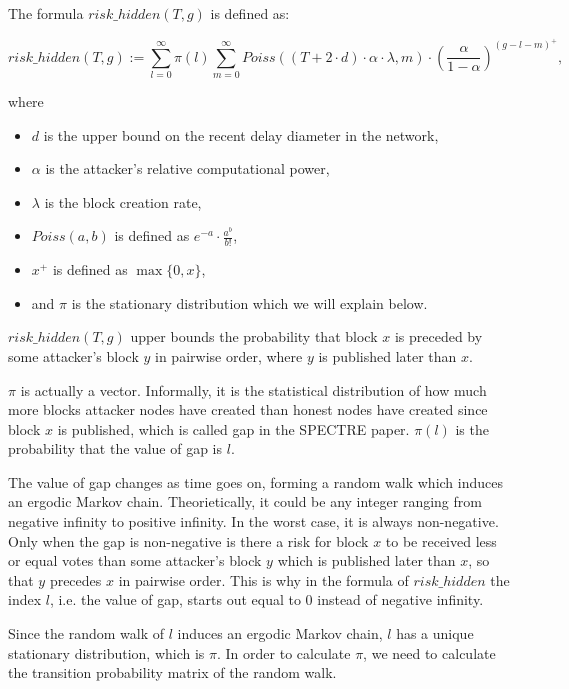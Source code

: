 \documentclass[a4paper,11pt]{article}
\begin{document}
The formula $risk\_hidden(T,g)$ is defined as:

$$
risk\_hidden(T,g) := \sum_{l=0}^{\infty} \pi(l) \sum_{m=0}^{\infty} Poiss((T + 2
\cdot d) \cdot \alpha \cdot \lambda, m) \cdot \left(\frac{\alpha}{1 -
\alpha}\right)^{(g - l - m)^+},
$$

where

\begin{itemize}
	\item $d$ is the upper bound on the recent delay diameter in the network,
	\item $\alpha$ is the attacker’s relative computational power,
	\item $\lambda$ is the block creation rate,
	\item $Poiss(a, b)$ is defined as $e^{-a} \cdot \frac{a^b}{b!}$,
	\item $x^+$ is defined as $\max\{0, x\}$,
	\item and $\pi$ is the stationary distribution which we will explain below.
\end{itemize}

$risk\_hidden(T,g)$ upper bounds the probability that block $x$ is preceded by
some attacker’s block $y$ in pairwise order, where $y$ is published later than
$x$. 

$\pi$ is actually a vector. Informally, it is the statistical distribution of
how much more blocks attacker nodes have created than honest nodes have created
since block $x$ is published, which is called gap in the SPECTRE paper. $\pi(l)$
is the probability that the value of gap is $l$.

The value of gap changes as time goes on, forming a random walk which induces an
ergodic Markov chain. Theorietically, it could be any integer ranging from
negative infinity to positive infinity. In the worst case, it is always
non-negative. Only when the gap is non-negative is there a risk for block $x$ to
be received less or equal votes than some attacker’s block $y$ which is
published later than $x$, so that $y$ precedes $x$ in pairwise order. This is
why in the formula of $risk\_hidden$ the index $l$, i.e. the value of gap,
starts out equal to 0 instead of negative infinity.

Since the random walk of $l$ induces an ergodic Markov chain, $l$ has a unique
stationary distribution, which is $\pi$. In order to calculate $\pi$, we need to
calculate the transition probability matrix of the random walk.
\end{document}
